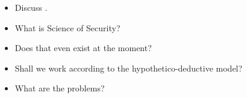 \begin{frame}
  \begin{example}
    \begin{itemize}
      \item Discuss 
        .
      \item What is Science of Security?
      \item Does that even exist at the moment?
      \item Shall we work according to the hypothetico-deductive model?
      \item What are the problems?
    \end{itemize}
  \end{example}
\end{frame}

